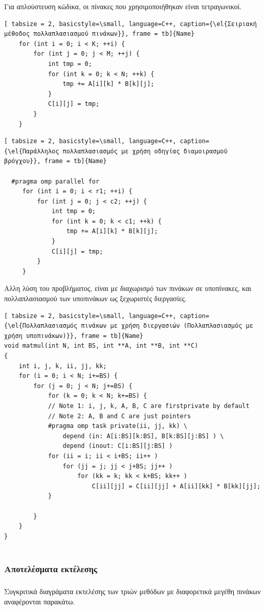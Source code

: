 \documentclass[12pt]{article}
\newcommand{\el}[1]{\selectlanguage{greek}{#1}\selectlanguage{english}}
\begin{document}
Για απλούστευση κώδικα, οι πίνακες που χρησιμοποιήθηκαν είναι τετραγωνικοί.

\begin{lstlisting}[ tabsize = 2, basicstyle=\small, language=C++, caption={\el{Σειριακή μέθοδος πολλαπλασιασμού πινάκων}}, frame = tb]{Name}
    for (int i = 0; i < K; ++i) {
        for (int j = 0; j < M; ++j) {
            int tmp = 0;
            for (int k = 0; k < N; ++k) {
                tmp += A[i][k] * B[k][j];
            }
            C[i][j] = tmp;
        }
    }
\end{lstlisting}

\begin{lstlisting}[ tabsize = 2, basicstyle=\small, language=C++, caption={\el{Παράλληλος πολλαπλασιασμός με χρήση οδηγίας διαμοιρασμού βρόγχου}}, frame = tb]{Name}

  #pragma omp parallel for
     for (int i = 0; i < r1; ++i) {
         for (int j = 0; j < c2; ++j) {
             int tmp = 0;
             for (int k = 0; k < c1; ++k) {
                 tmp += A[i][k] * B[k][j];
             }
             C[i][j] = tmp;
         }
     }
\end{lstlisting}
Αλλη λύση του προβλήματος, είναι με διαχωρισμό των πινάκων σε υποπίνακες, και πολλαπλασιασμού των υποπινάκων ως ξεχωριστές διεργασίες\cite{examplesopm45}.

\begin{lstlisting}[ tabsize = 2, basicstyle=\small, language=C++, caption={\el{Πολλαπλασιασμός πινάκων με χρήση διεργασιών (Πολλαπλασιασμός με χρήση υποπινάκων)}}, frame = tb]{Name}
void matmul(int N, int BS, int **A, int **B, int **C)
{
	int i, j, k, ii, jj, kk;
	for (i = 0; i < N; i+=BS) {
    	for (j = 0; j < N; j+=BS) {
        	for (k = 0; k < N; k+=BS) {
			// Note 1: i, j, k, A, B, C are firstprivate by default
			// Note 2: A, B and C are just pointers
			#pragma omp task private(ii, jj, kk) \
            	depend (in: A[i:BS][k:BS], B[k:BS][j:BS] ) \
            	depend (inout: C[i:BS][j:BS] )
			for (ii = i; ii < i+BS; ii++ )
				for (jj = j; jj < j+BS; jj++ )
					for (kk = k; kk < k+BS; kk++ )
						C[ii][jj] = C[ii][jj] + A[ii][kk] * B[kk][jj];
            }
        
        }
    }
}


\end{lstlisting}

\clearpage

\subsubsection{ Αποτελέσματα εκτέλεσης}
\subparagraph{}
Συγκριτικά διαγράματα εκτελέσης των τριών μεθόδων με διαφορετικά μεγέθη πινάκων αναφέρονται παρακάτω.
\end{document}
